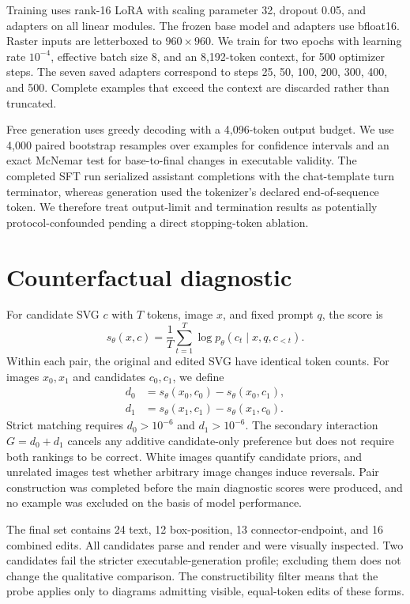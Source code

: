 \documentclass{article}
\begin{document}
Training uses rank-16 LoRA with scaling parameter 32, dropout 0.05, and adapters on all linear modules. The frozen base model and adapters use bfloat16. Raster inputs are letterboxed to $960\times960$. We train for two epochs with learning rate $10^{-4}$, effective batch size 8, and an 8,192-token context, for 500 optimizer steps. The seven saved adapters correspond to steps 25, 50, 100, 200, 300, 400, and 500. Complete examples that exceed the context are discarded rather than truncated.

Free generation uses greedy decoding with a 4,096-token output budget. We use 4,000 paired bootstrap resamples over examples for confidence intervals and an exact McNemar test for base-to-final changes in executable validity. The completed SFT run serialized assistant completions with the chat-template turn terminator, whereas generation used the tokenizer's declared end-of-sequence token. We therefore treat output-limit and termination results as potentially protocol-confounded pending a direct stopping-token ablation.

\section{Counterfactual diagnostic}
\label{app:probe}

For candidate SVG $c$ with $T$ tokens, image $x$, and fixed prompt $q$, the score is
\begin{equation}
  s_\theta(x,c)=\frac{1}{T}\sum_{t=1}^{T}\log p_\theta(c_t\mid x,q,c_{<t}).
\end{equation}
Within each pair, the original and edited SVG have identical token counts. For images $x_0,x_1$ and candidates $c_0,c_1$, we define
\begin{align}
  d_0 &= s_\theta(x_0,c_0)-s_\theta(x_0,c_1), \\
  d_1 &= s_\theta(x_1,c_1)-s_\theta(x_1,c_0).
\end{align}
Strict matching requires $d_0>10^{-6}$ and $d_1>10^{-6}$. The secondary interaction $G=d_0+d_1$ cancels any additive candidate-only preference but does not require both rankings to be correct. White images quantify candidate priors, and unrelated images test whether arbitrary image changes induce reversals. Pair construction was completed before the main diagnostic scores were produced, and no example was excluded on the basis of model performance.

The final set contains 24 text, 12 box-position, 13 connector-endpoint, and 16 combined edits. All candidates parse and render and were visually inspected. Two candidates fail the stricter executable-generation profile; excluding them does not change the qualitative comparison. The constructibility filter means that the probe applies only to diagrams admitting visible, equal-token edits of these forms.
\end{document}
